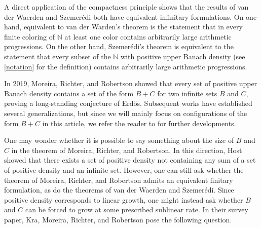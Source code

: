 \documentclass[letter, 11pt]{article}
\theoremstyle{plain} %
\theoremstyle{definition} %
\theoremstyle{plain}
\theoremstyle{plain}
\newcommand{\N}{\mathbb{N}}
\newcommand{\1}{\mathbbm{1}}
\begin{document}
A direct application of the compactness principle shows that the results of van der Waerden and Szemer\'edi both have equivalent infinitary formulations. On one hand, equivalent to van der Warden's theorem is the statement that in every finite coloring of $\N$ at least one color contains arbitrarily large arithmetic progressions. On the other hand, Szemer\'edi's theorem is equivalent to the statement that every subset of the $\N$ with positive upper Banach density (see \cref{notation} for the definition) contains arbitrarily large arithmetic progressions.    
 
In 2019, Moreira, Richter, and Robertson \cite{Moreira_Richter_Robertson19} showed that every set of positive upper Banach density contains a set of the form $B+C$ for two infinite sets $B$ and $C$, proving a long-standing conjecture of Erd\H{o}s. Subsequent works have established several generalizations, but since we will mainly focus on configurations of the form $B+C$ in this article, we refer the reader to 
\cite{Charamaras_Mountakis_2025,FH25,HKR25,host2019short,Kousek_2026,Kra_Moreira_Richter_Robertson:2022,Kra_Moreira_Richter_Robertson:2023,kmrr25} for further developments.

One may wonder whether it is possible to say something about the size of $B$ and $C$ in the theorem of Moreira, Richter, and Robertson. In this direction, Host \cite{host2019short} showed that there exists a set of positive density not containing any sum of a set of positive density and an infinite set. However, one can still ask whether the theorem of Moreira, Richter, and Robertson admits an equivalent finitary formulation, as do the theorems of van der Waerden and Szemerédi. Since positive density corresponds to linear growth, one might instead ask whether $B$ and $C$ can be forced to grow at some prescribed sublinear rate. In their survey paper, Kra, Moreira, Richter, and Robertson \cite{Kra_Moreira_Richter_Robertson_problems} pose the following question.
\end{document}
